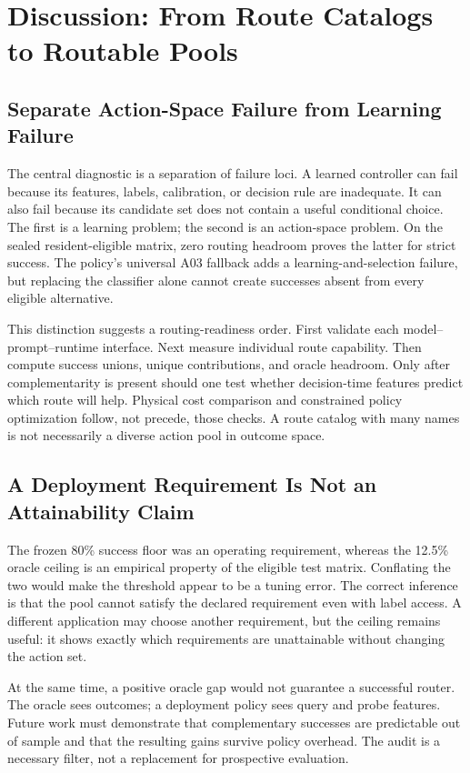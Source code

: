 \section{Discussion: From Route Catalogs to Routable Pools}
\label{sec:discussion}

\subsection{Separate Action-Space Failure from Learning Failure}

The central diagnostic is a separation of failure loci. A learned controller can
fail because its features, labels, calibration, or decision rule are inadequate.
It can also fail because its candidate set does not contain a useful conditional
choice. The first is a learning problem; the second is an action-space problem.
On the sealed resident-eligible matrix, zero routing headroom proves the latter for
strict success. The policy's universal A03 fallback adds a learning-and-selection failure,
but replacing the classifier alone cannot create successes absent from every
eligible alternative.

This distinction suggests a routing-readiness order. First validate each
model--prompt--runtime interface. Next measure individual route capability. Then
compute success unions, unique contributions, and oracle headroom. Only after
complementarity is present should one test whether decision-time features predict
which route will help. Physical cost comparison and constrained policy optimization
follow, not precede, those checks. A route catalog with many names is not necessarily
a diverse action pool in outcome space.

\subsection{A Deployment Requirement Is Not an Attainability Claim}

The frozen 80\% success floor was an operating requirement, whereas the 12.5\%
oracle ceiling is an empirical property of the eligible test matrix. Conflating the
two would make the threshold appear to be a tuning error. The correct inference is
that the pool cannot satisfy the declared requirement even with label access. A
different application may choose another requirement, but the ceiling remains
useful: it shows exactly which requirements are unattainable without changing the
action set.

At the same time, a positive oracle gap would not guarantee a successful router.
The oracle sees outcomes; a deployment policy sees query and probe features. Future
work must demonstrate that complementary successes are predictable out of sample
and that the resulting gains survive policy overhead. The audit is a necessary
filter, not a replacement for prospective evaluation.

